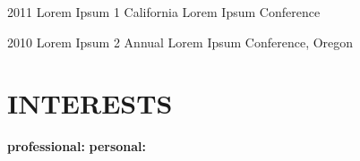 \documentclass[]{corleo-cv}
\begin{document}
\begin{entrylist}
    \entry
    {2011}
    {Lorem Ipsum 1}
    {California Lorem Ipsum Conference}
    {\lipsum[1-7][11-12]}

    \entry
    {2010}
    {Lorem Ipsum 2}
    {Annual Lorem Ipsum Conference, Oregon}
    {\lipsum[1-7][13-14]}
\end{entrylist}

\section{INTERESTS}

\textbf{professional:} \lipsum[1-7][15-17]\setline[.1]
\textbf{personal:} \lipsum[1-7][18-20]
\end{document}
